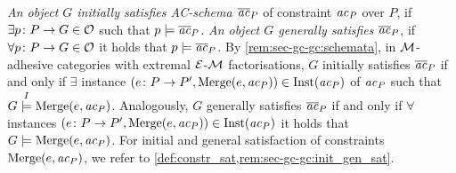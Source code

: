\begin{definition}
\label{rem:sec-gc-gc:init_gen_sat_ac_schema}
\emph{An object $G$ initially satisfies AC-schema $\overline{\mathit{ac}}_P$} of constraint $\mathit{ac}_P$ over $P$, if $\exists p\colon P \to G \in {\cal O}$ such that $p \models \overline{\mathit{ac}}_P$.
\emph{An object $G$ generally satisfies $\overline{\mathit{ac}}_P$}, if $\forall p\colon P \to G \in {\cal O}$ it holds that $p \models \overline{\mathit{ac}}_P$.
By \cref{rem:sec-gc-gc:schemata}, in ${\cal M}$-adhesive categories with extremal $\mathcal{E}$-${\cal M}$ factorisations, $G$ initially satisfies $\overline{\mathit{ac}}_P$ if and only if $\exists$ instance $(e\colon P \to P',\mathrm{Merge}(e,\mathit{ac}_P)) \in \mathrm{Inst}(\mathit{ac}_P)$ of $\mathit{ac}_P$ such that $G \stackrel{I}{\models} \mathrm{Merge}(e,\mathit{ac}_P)$.
Analogously, $G$ generally satisfies $\overline{\mathit{ac}}_P$ if and only if $\forall$ instances $(e\colon P \to P',\mathrm{Merge}(e,\mathit{ac}_P)) \in \mathrm{Inst}(\mathit{ac}_P)$ it holds that $G \models \mathrm{Merge}(e,\mathit{ac}_P)$.
For initial and general satisfaction of constraints $\mathrm{Merge}(e,\mathit{ac}_P)$, we refer to \cref{def:constr_sat,rem:sec-gc-gc:init_gen_sat}.
\envEndMarker
\end{definition}

